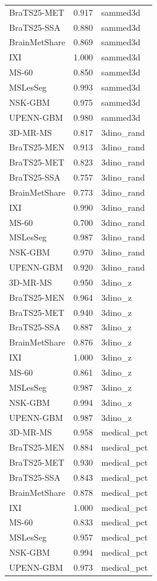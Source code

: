 \begin{tabular}{lrl}
BraTS25-MET & 0.917 & sammed3d \\
BraTS25-SSA & 0.880 & sammed3d \\
BrainMetShare & 0.869 & sammed3d \\
IXI & 1.000 & sammed3d \\
MS-60 & 0.850 & sammed3d \\
MSLesSeg & 0.993 & sammed3d \\
NSK-GBM & 0.975 & sammed3d \\
UPENN-GBM & 0.980 & sammed3d \\
3D-MR-MS & 0.817 & 3dino\_rand \\
BraTS25-MEN & 0.913 & 3dino\_rand \\
BraTS25-MET & 0.823 & 3dino\_rand \\
BraTS25-SSA & 0.757 & 3dino\_rand \\
BrainMetShare & 0.773 & 3dino\_rand \\
IXI & 0.990 & 3dino\_rand \\
MS-60 & 0.700 & 3dino\_rand \\
MSLesSeg & 0.987 & 3dino\_rand \\
NSK-GBM & 0.970 & 3dino\_rand \\
UPENN-GBM & 0.920 & 3dino\_rand \\
3D-MR-MS & 0.950 & 3dino\_z \\
BraTS25-MEN & 0.964 & 3dino\_z \\
BraTS25-MET & 0.940 & 3dino\_z \\
BraTS25-SSA & 0.887 & 3dino\_z \\
BrainMetShare & 0.876 & 3dino\_z \\
IXI & 1.000 & 3dino\_z \\
MS-60 & 0.861 & 3dino\_z \\
MSLesSeg & 0.987 & 3dino\_z \\
NSK-GBM & 0.994 & 3dino\_z \\
UPENN-GBM & 0.987 & 3dino\_z \\
3D-MR-MS & 0.958 & medical\_pct \\
BraTS25-MEN & 0.884 & medical\_pct \\
BraTS25-MET & 0.930 & medical\_pct \\
BraTS25-SSA & 0.843 & medical\_pct \\
BrainMetShare & 0.878 & medical\_pct \\
IXI & 1.000 & medical\_pct \\
MS-60 & 0.833 & medical\_pct \\
MSLesSeg & 0.957 & medical\_pct \\
NSK-GBM & 0.994 & medical\_pct \\
UPENN-GBM & 0.973 & medical\_pct \\
\bottomrule
\end{tabular}
